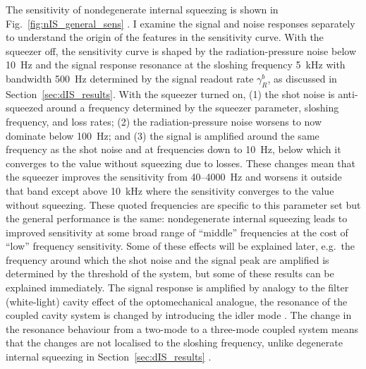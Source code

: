 
The sensitivity of nondegenerate internal squeezing is shown in Fig.~\ref{fig:nIS_general_sens} . I examine the signal and noise responses separately to understand the origin of the features in the sensitivity curve.
With the squeezer off, the sensitivity curve is shaped by the radiation-pressure noise below 10~Hz and the signal response resonance at the sloshing frequency 5~kHz with bandwidth 500~Hz determined by the signal readout rate $\gamma^b_R$, as discussed in Section~\ref{sec:dIS_results}. With the squeezer turned on, (1) the shot noise is anti-squeezed around a frequency determined by the squeezer parameter, sloshing frequency, and loss rates; (2) the radiation-pressure noise worsens to now dominate below 100~Hz; and (3) the signal is amplified around the same frequency as the shot noise and at frequencies down to 10~Hz, below which it converges to the value without squeezing due to losses. These changes mean that the squeezer improves the sensitivity from 40--4000~Hz and worsens it outside that band except above 10~kHz where the sensitivity converges to the value without squeezing.
These quoted frequencies are specific to this parameter set but the general performance is the same: nondegenerate internal squeezing leads to improved sensitivity at some broad range of ``middle'' frequencies at the cost of ``low'' frequency sensitivity. 
Some of these effects will be explained later, e.g.\ the frequency around which the shot noise and the signal peak are amplified is determined by the threshold of the system, but some of these results can be explained immediately.
The signal response is amplified by analogy to the filter (white-light) cavity effect of the optomechanical analogue, the resonance of the coupled cavity system is changed by introducing the idler mode . The change in the resonance behaviour from a two-mode to a three-mode coupled system means that the changes are not localised to the sloshing frequency, unlike degenerate internal squeezing in Section~\ref{sec:dIS_results} . 
